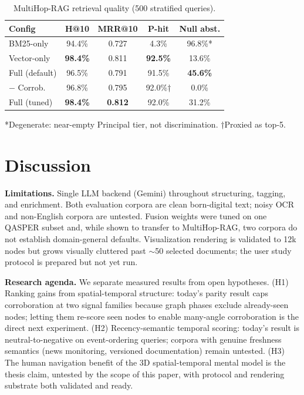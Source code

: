 \documentclass[conference,a4paper]{IEEEtran}
\begin{document}
\begin{table}[t]
\centering
\caption{MultiHop-RAG retrieval quality (500 stratified queries).}
\label{tab:multihop}
\scriptsize
\setlength{\tabcolsep}{3pt}
\begin{tabular}{lcccc}
\toprule
Config & H@10 & MRR@10 & P-hit & Null abst. \\
\midrule
BM25-only & 94.4\% & 0.727 & 4.3\% & 96.8\%* \\
Vector-only & \textbf{98.4\%} & 0.811 & \textbf{92.5\%} & 13.6\% \\
Full (default) & 96.5\% & 0.791 & 91.5\% & \textbf{45.6\%} \\
$-$ Corrob. & 96.8\% & 0.795 & 92.0\%† & 0.0\% \\
Full (tuned) & \textbf{98.4\%} & \textbf{0.812} & 92.0\% & 31.2\% \\
\bottomrule
\end{tabular}
\vspace{2pt}
\footnotesize{*Degenerate: near-empty Principal tier, not discrimination. †Proxied as top-5.}
\end{table}

\section{Discussion}

\textbf{Limitations.} Single LLM backend (Gemini) throughout structuring, tagging, and enrichment. Both evaluation corpora are clean born-digital text; noisy OCR and non-English corpora are untested. Fusion weights were tuned on one QASPER subset and, while shown to transfer to MultiHop-RAG, two corpora do not establish domain-general defaults. Visualization rendering is validated to 12k nodes but grows visually cluttered past $\sim$50 selected documents; the user study protocol is prepared but not yet run.

\textbf{Research agenda.} We separate measured results from open hypotheses. (H1) Ranking gains from spatial-temporal structure: today's parity result caps corroboration at two signal families because graph phases exclude already-seen nodes; letting them re-score seen nodes to enable many-angle corroboration is the direct next experiment. (H2) Recency-semantic temporal scoring: today's result is neutral-to-negative on event-ordering queries; corpora with genuine freshness semantics (news monitoring, versioned documentation) remain untested. (H3) The human navigation benefit of the 3D spatial-temporal mental model is the thesis claim, untested by the scope of this paper, with protocol and rendering substrate both validated and ready.
\end{document}

